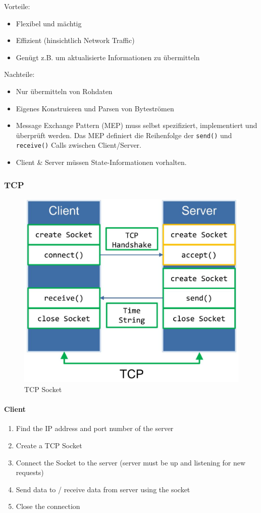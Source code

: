Vorteile:
\begin{itemize}
	\item Flexibel und mächtig
	\item Effizient (hinsichtlich Network Traffic)
	\item Genügt z.B. um aktualisierte Informationen zu übermitteln
\end{itemize}

Nachteile:
\begin{itemize}
	\item Nur übermitteln von Rohdaten
	\item Eigenes Konstruieren und Parsen von Byteströmen
	\item Message Exchange Pattern (MEP) muss selbst spezifiziert, implementiert und überprüft werden. Das MEP definiert die Reihenfolge der \lstinline|send()| und \lstinline|receive()| Calls zwischen Client/Server.
	\item Client \& Server müssen State-Informationen vorhalten.
\end{itemize}

\clearpage

\subsubsection{TCP}
\begin{figure}[h!]
	\centering
	\includegraphics[width=0.5\linewidth]{img/tcp_socket}
	\caption{TCP Socket}
	\label{fig:tcpsocket}
\end{figure}

\paragraph{Client}
\begin{enumerate}
	\item Find the IP address and port number of the server
	\item Create a TCP Socket
	\item Connect the Socket to the server (server must be up and listening for new requests)
	\item Send data to / receive data from server using the socket
	\item Close the connection
\end{enumerate}

